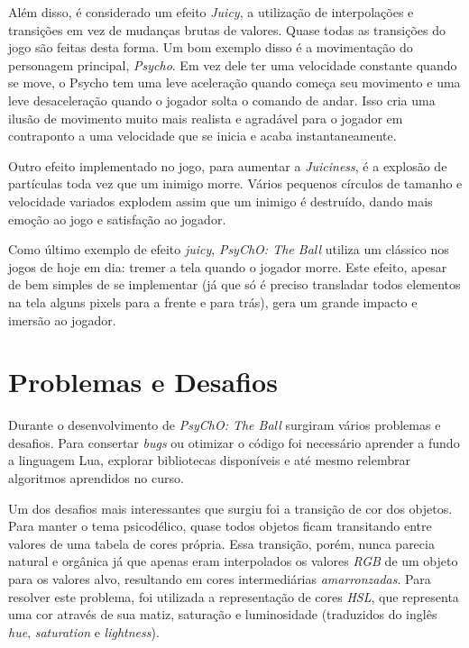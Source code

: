 Além disso, é considerado um efeito \textit{Juicy}, a utilização de interpolações e transições em vez de mudanças brutas de valores. Quase todas as transições do jogo são feitas desta forma. Um bom exemplo disso é a movimentação do personagem principal, \textit{Psycho}. Em vez dele ter uma velocidade constante quando se move, o Psycho tem uma leve aceleração quando começa seu movimento e uma leve desaceleração quando o jogador solta o comando de andar. Isso cria uma ilusão de movimento muito mais realista e agradável para o jogador em contraponto a uma velocidade que se inicia e acaba instantaneamente.

Outro efeito implementado no jogo, para aumentar a \textit{Juiciness}, é a explosão de partículas toda vez que um inimigo morre. Vários pequenos círculos de tamanho e velocidade variados explodem assim que um inimigo é destruído, dando mais emoção ao jogo e satisfação ao jogador.

Como último exemplo de efeito \textit{juicy}, \textit{PsyChO: The Ball} utiliza um clássico nos jogos de hoje em dia: tremer a tela quando o jogador morre. Este efeito, apesar de bem simples de se implementar (já que só é preciso transladar todos elementos na tela alguns pixels para a frente e para trás), gera um grande impacto e imersão ao jogador.

\section{Problemas e Desafios}
\label{sec:problemas_e_desafios}

Durante o desenvolvimento de \textit{PsyChO: The Ball} surgiram vários problemas e desafios. Para consertar \textit{bugs} ou otimizar o código foi necessário aprender a fundo a linguagem Lua, explorar bibliotecas disponíveis e até mesmo relembrar algoritmos aprendidos no curso.

Um dos desafios mais interessantes que surgiu foi a transição de cor dos objetos. Para manter o tema psicodélico, quase todos objetos ficam transitando entre valores de uma tabela de cores própria. Essa transição, porém, nunca parecia natural e orgânica já que apenas eram interpolados os valores \textit{RGB} de um objeto para os valores alvo, resultando em cores intermediárias \textit{amarronzadas}. Para resolver este problema, foi utilizada a representação de cores \textit{HSL}, que representa uma cor através de sua matiz, saturação e luminosidade (traduzidos do inglês \textit{hue}, \textit{saturation} e \textit{lightness}).

